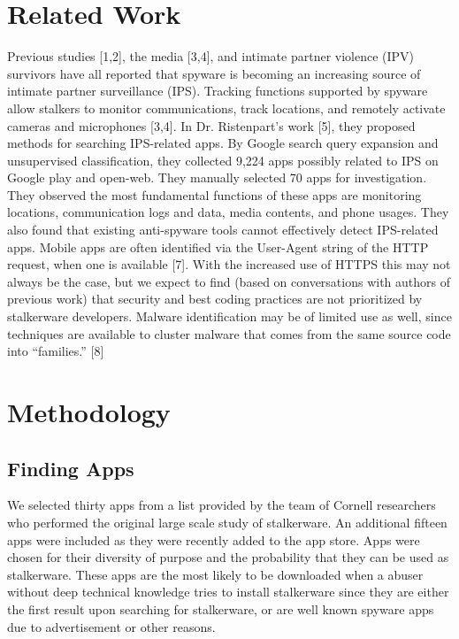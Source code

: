 \documentclass[acmtog]{acmart}
\begin{document}
\section{Related Work}
Previous studies [1,2], the media [3,4], and intimate partner violence (IPV) 
survivors have all reported that spyware is becoming an increasing source of 
intimate partner surveillance (IPS). Tracking functions supported by spyware 
allow stalkers to monitor communications, track locations, and remotely 
activate cameras and microphones [3,4]. In Dr. Ristenpart’s work [5], they 
proposed methods for searching IPS-related apps. By Google search query 
expansion and unsupervised classification, they collected 9,224 apps possibly 
related to IPS on Google play and open-web. They manually selected 70 apps for 
investigation. They observed the most fundamental functions of these apps are 
monitoring locations, communication logs and data, media contents, and phone 
usages. They also found that existing anti-spyware tools cannot effectively 
detect IPS-related apps.
Mobile apps are often identified via the User-Agent string of the HTTP request, 
when one is available [7]. With the increased use of HTTPS this may not always 
be the case, but we expect to find (based on conversations with authors of 
previous work) that security and best coding practices are not prioritized by 
stalkerware developers. Malware identification may be of limited use as well, 
since techniques are available to cluster malware that comes from the same 
source code into “families.” [8]

\section{Methodology}
\subsection{Finding Apps}
We selected thirty apps from a list provided by the team of Cornell researchers 
who performed the original large scale study of 
stalkerware\cite{chatterjee_spyware_2018}. An 
additional fifteen apps were included as they were recently added to the app 
store. Apps were chosen for their diversity of purpose and the probability that 
they can be used as stalkerware. These apps are the most likely to be 
downloaded when a abuser without deep technical knowledge tries to install 
stalkerware since they are either the first result upon searching for 
stalkerware, or are well known spyware apps due to advertisement or other 
reasons. 
\end{document}
